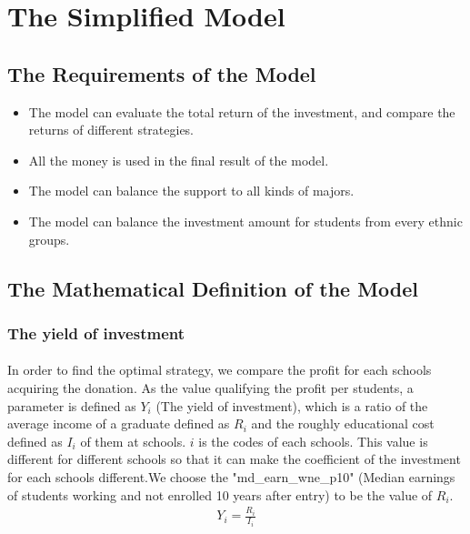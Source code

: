 \documentclass{mcmthesis}
\begin{document}
\section{The Simplified Model}
\subsection{The Requirements of the Model}

\begin{itemize}
\item The model can evaluate the total return of the investment, and compare the returns of different  strategies.
\item All the money is used in the final result of the model.
\item The model can balance the support to all kinds of majors.
\item The model can balance the investment amount for students from every ethnic groups.
\end{itemize}



\subsection{The Mathematical Definition of the Model}
\subsubsection{The yield of investment}  
\paragraph{} In order to find the optimal strategy, we compare the profit for each schools acquiring the donation. As the value qualifying the profit per students, a parameter is defined as $Y_i$ (The yield of investment), which is a ratio of the average income of a graduate defined as $R_i$ and the roughly educational cost defined as $I_i$ of them at schools. $i$ is the codes of each schools. This value is different for different schools so that it can make the coefficient of the investment for each schools different.We choose the "md\_earn\_wne\_p10" (Median earnings of students working and not enrolled 10 years after entry) to be the value of $R_i$. 
\begin{align}
Y_i=\frac{R_i}{I_i}
\end{align}
\end{document}
